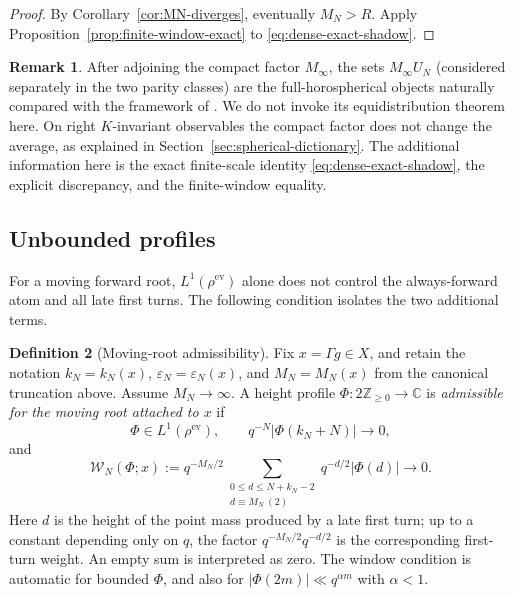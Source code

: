 \documentclass[11pt]{amsart}
\theoremstyle{definition}
\newtheorem{definition}{Definition}[section]
\newtheorem{remark}[definition]{Remark}
\theoremstyle{plain}
\newcommand{\ZZ}{\mathbb Z}
\newcommand{\CC}{\mathbb C}
\newcommand{\ev}{\mathrm{ev}}
\begin{document}
\begin{proof}
By Corollary~\ref{cor:MN-diverges}, eventually \(M_N>R\).  Apply
Proposition~\ref{prop:finite-window-exact} to
\eqref{eq:dense-exact-shadow}.
\end{proof}

\begin{remark}
After adjoining the compact factor \(M_\infty\), the sets \(M_\infty U_N\)
(considered separately in the two parity classes) are the full-horospherical
objects naturally compared with the framework of \cite{CFS2022}.  We do not
invoke its equidistribution theorem here.  On right \(K\)-invariant observables
the compact factor does not change the average, as explained in
Section~\ref{sec:spherical-dictionary}.
The additional information here is the exact finite-scale identity
\eqref{eq:dense-exact-shadow}, the explicit discrepancy, and the finite-window
equality.
\end{remark}

\subsection{Unbounded profiles}
For a moving forward root, \(L^1(\rho^{\ev})\) alone does not control the
always-forward atom and all late first turns.  The following condition isolates
the two additional terms.

\begin{definition}[Moving-root admissibility]
\label{def:moving-admissible}
Fix \(x=\Gamma g\in X\), and retain the notation
\(k_N=k_N(x)\), \(\varepsilon_N=\varepsilon_N(x)\), and \(M_N=M_N(x)\) from
the canonical truncation above.  Assume \(M_N\to\infty\).  A height profile
\(\Phi:2\ZZ_{\ge0}\to\CC\) is \emph{admissible for the moving root attached to
\(x\)} if
\[
\Phi\in L^1(\rho^{\ev}),\qquad
q^{-N}|\Phi(k_N+N)|\longrightarrow0,
\]
and
\begin{equation}\label{eq:window-admissibility}
\mathcal W_N(\Phi;x)
 :=q^{-M_N/2}
 \sum_{\substack{0\le d\le N+k_N-2\\ d\equiv M_N\ (2)}}
 q^{-d/2}|\Phi(d)|\longrightarrow0.
\end{equation}
Here \(d\) is the height of the point mass produced by a late first turn; up
to a constant depending only on \(q\), the factor
\(q^{-M_N/2}q^{-d/2}\) is the corresponding first-turn weight.
An empty sum is interpreted as zero.  The window condition is automatic for
bounded \(\Phi\), and also for \(|\Phi(2m)|\ll q^{\alpha m}\) with \(\alpha<1\).
\end{definition}
\end{document}
